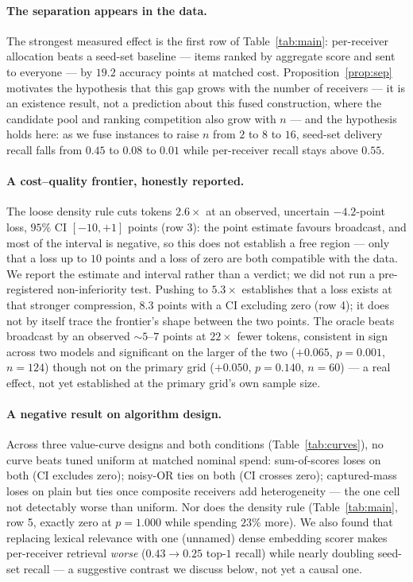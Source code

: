 \documentclass[sigconf,anonymous]{aamas}
\theoremstyle{remark}
\begin{document}
\paragraph{The separation appears in the data.} The strongest measured
effect is the first row of Table~\ref{tab:main}: per-receiver
allocation beats a seed-set baseline --- items ranked by aggregate
score and sent to everyone --- by $19.2$ accuracy points at matched
cost. Proposition~\ref{prop:sep} motivates the hypothesis that this gap
grows with the number of receivers --- it is an existence result, not
a prediction about this fused construction, where the candidate pool
and ranking competition also grow with $n$ --- and the hypothesis
holds here: as we fuse instances to raise $n$ from $2$ to $8$ to $16$,
seed-set delivery recall falls from $0.45$ to $0.08$ to $0.01$ while
per-receiver recall stays above $0.55$.

\paragraph{A cost--quality frontier, honestly reported.} The loose
density rule cuts tokens $2.6\times$ at an observed, uncertain
$-4.2$-point loss, $95\%$ CI $[-10,+1]$ points (row 3): the point
estimate favours broadcast, and most of the interval is negative, so
this does not establish a free region --- only that a loss up to $10$
points and a loss of zero are both compatible with the data. We report
the estimate and interval rather than a verdict; we did not run a
pre-registered non-inferiority test. Pushing to $5.3\times$ establishes
that a loss exists at that stronger compression, $8.3$ points with a
CI excluding zero (row 4); it does not by itself trace the frontier's
shape between the two points. The oracle beats broadcast by an observed
$\sim5$--$7$ points at $22\times$ fewer tokens, consistent in sign
across two models and significant on the larger of the two
($+0.065$, $p=0.001$, $n=124$) though not on the primary grid
($+0.050$, $p=0.140$, $n=60$) --- a real effect, not yet established at
the primary grid's own sample size.

\paragraph{A negative result on algorithm design.} Across three
value-curve designs and both conditions (Table~\ref{tab:curves}), no
curve beats tuned uniform at matched nominal spend: sum-of-scores
loses on both (CI excludes zero); noisy-OR ties on both (CI crosses
zero); captured-mass loses on plain but ties once composite receivers
add heterogeneity --- the one cell not detectably worse than uniform.
Nor does the density rule (Table~\ref{tab:main}, row 5, exactly zero at
$p=1.000$ while spending $23\%$ more). We also found that replacing
lexical relevance with one (unnamed)
dense embedding scorer makes per-receiver retrieval \emph{worse}
($0.43 \to 0.25$ top-$1$ recall) while nearly doubling seed-set recall
--- a suggestive contrast we discuss below, not yet a causal one.
\end{document}
